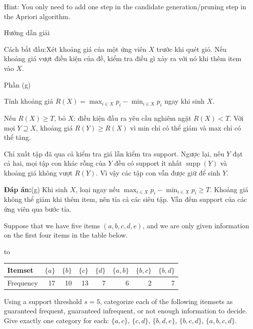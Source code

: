 \documentclass[10pt,a4paper,twocolumn]{article}
\makeatletter
\newcommand{\maptag}[1]{\phantomsection\@bsphack\protected@write\@auxout{}{\string\newlabel{#1}{{}{\thepage}{}{\@currentHref}{}}}\@esphack}
\newcommand{\key}[1]{#1:\enspace}
\newcommand{\solutionprompt}[1]{\par\addvspace{1pt}\noindent\key{Cách bắt đầu}#1\par\addvspace{2pt}}
\newcommand{\blocklabel}[1]{\par\noindent#1\par\nobreak}
\newcommand{\answer}[1]{%
  \par\addvspace{3pt}%
  \blocklabel{#1Hướng dẫn giải}}
\newcommand{\finalanswer}[1]{%
  \par\addvspace{3pt}\noindent\textbf{Đáp án:}\nobreak\enspace#1\par}
\newcommand{\guidepart}[1]{%
  \par\addvspace{1.5pt}%
  \blocklabel{Phần #1}}
\newenvironment{examtable}[1]{%
  \par\addvspace{2pt}\noindent\hbox to \linewidth\bgroup\hfil
  \setlength{\tabcolsep}{4pt}%
  \renewcommand{\arraystretch}{1.12}\begin{tabular}{#1}%
}{\end{tabular}\hfil\egroup\par\addvspace{2pt}}
\makeatother
\begin{document}
Hint: You only need to add one step in the candidate generation/pruning step in the Apriori algorithm.

\answer{\maptag{answer:P25-Q1g}}
\solutionprompt{Xét khoảng giá của một ứng viên $X$ trước khi quét giỏ. Nếu khoảng giá vượt điều kiện của đề, kiểm tra điều gì xảy ra với nó khi thêm item vào $X$.}
\guidepart{(g)}
\begin{guidesteps}
\item Tính khoảng giá $R(X)=\max_{i\in X}p_i-\min_{i\in X}p_i$ ngay khi sinh $X$.
\item Nếu $R(X)\ge T$, bỏ $X$: điều kiện đầu ra yêu cầu nghiêm ngặt $R(X)<T$. Với mọi $Y\supseteq X$, khoảng giá $R(Y)\ge R(X)$ vì min chỉ có thể giảm và max chỉ có thể tăng.
\item Chỉ xuất tập đã qua cả kiểm tra giá lẫn kiểm tra support. Ngược lại, nếu $Y$ đạt cả hai, mọi tập con khác rỗng của $Y$ đều có support ít nhất $\operatorname{supp}(Y)$ và khoảng giá không vượt $R(Y)$. Vì vậy các tập con vẫn được giữ để sinh $Y$.
\end{guidesteps}
\finalanswer{(g) Khi sinh $X$, loại ngay nếu $\max_{i\in X}p_i-\min_{i\in X}p_i\ge T$. Khoảng giá không thể giảm khi thêm item, nên tỉa cả các siêu tập. Vẫn đếm support của các ứng viên qua bước tỉa.}

Suppose that we have five items $(a,b,c,d,e)$, and we are only given information on the first four items in the table below.
\begin{examtable}{@{}lrrrrrrr@{}}
\toprule
Itemset & $\{a\}$ & $\{b\}$ & $\{c\}$ & $\{d\}$ & $\{a,b\}$ & $\{b,c\}$ & $\{b,d\}$\\
\midrule
Frequency & 17 & 10 & 13 & 7 & 6 & 2 & 7\\
\bottomrule
\end{examtable}
Using a support threshold $s=5$, categorize each of the following itemsets as guaranteed frequent, guaranteed infrequent, or not enough information to decide. Give exactly one category for each: $\{a,c\}$, $\{c,d\}$, $\{b,d,e\}$, $\{b,c,d\}$, $\{a,b,c,d\}$.
\end{document}
